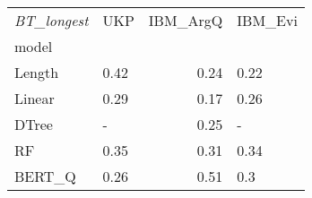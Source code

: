 \begin{tabular}{llrl}
\toprule
\textit{BT\_longest} &   UKP &  IBM\_ArgQ & IBM\_Evi \\
model  &       &           &         \\
\midrule
Length &  0.42 &      0.24 &    0.22 \\
Linear &  0.29 &      0.17 &    0.26 \\
DTree  &     - &      0.25 &       - \\
RF     &  0.35 &      0.31 &    0.34 \\
BERT\_Q &  0.26 &      0.51 &     0.3 \\
\bottomrule
\end{tabular}
